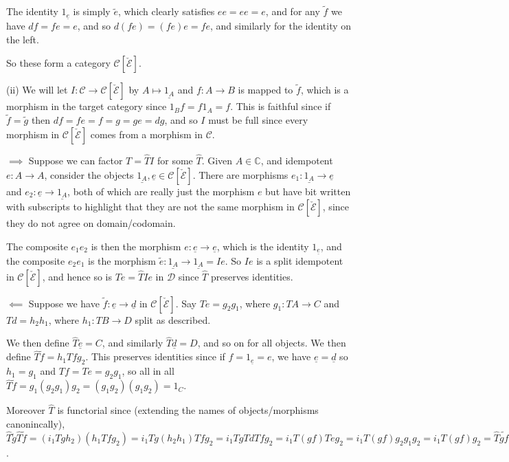 \documentclass[]{article}
\theoremstyle{custhm}
\theoremstyle{cusdef}
\theoremstyle{custhm}
\theoremstyle{custhm}
\theoremstyle{custhm}
\theoremstyle{custhm}
\theoremstyle{cusdef}
\theoremstyle{remark}
\newcommand{\C}{\mathbb{C}}
\newcommand{\ra}{\rightarrow}
\begin{document}
The identity $1_{\underline{e}}$ is simply $\tilde{e}$, which clearly satisfies $ee = ee = e$, and for any $\tilde{f}$ we have $df = fe = e$, and so $d(fe) = (fe)e = fe$, and similarly for the identity on the left.

So these form a category $\mathcal{C}[\check{\mathcal{E}}]$.

(ii) We will let $I: \mathcal{C} \ra \mathcal{C}[\check{\mathcal{E}}]$ by $A\mapsto \underline{1_A}$ and $f:A\ra B$ is mapped to $\tilde{f}$, which is a morphism in the target category since $1_Bf = f1_A = f$. This is faithful since if $\tilde{f} = \tilde{g}$ then $df = fe = f = g = ge = dg$, and so $I$ must be full since every morphism in $\mathcal{C}[\check{\mathcal{E}}]$ comes from a morphism in $\mathcal{C}$.


$\implies$ Suppose we can factor $T = \widehat{T}I$ for some $\widehat{T}$. Given $A\in \C$, and idempotent $e:A\ra A$, consider the objects $\underline{1_A},\underline{e} \in \mathcal{C}[\check{\mathcal{E}}]$. There are morphisms $e_1 : \underline{1_A}\ra \underline{e}$ and $e_2 : \underline{e}\ra \underline{1_A}$, both of which are really just the morphism $e$ but have bit written with subscripts to highlight that they are not the same morphism in $\mathcal{C}[\check{\mathcal{E}}]$, since they do not agree on domain/codomain.

The composite $e_1e_2$ is then the morphism $e:\underline{e}\ra\underline{e}$, which is the identity $1_{\underline{e}}$, and the composite $e_2e_1$ is the morphism $\tilde{e}:\underline{1_A}\ra\underline{1_A} = Ie$. So $Ie$ is a split idempotent in $\mathcal{C}[\check{\mathcal{E}}]$, and hence so is $Te = \widehat{T}Ie$ in $\mathcal{D}$ since $\widehat{T}$ preserves identities.

$\impliedby$ Suppose we have $\tilde{f}:\underline{e}\ra\underline{d}$ in $\mathcal{C}[\check{\mathcal{E}}]$. Say $Te = g_2g_1$, where $g_1:TA\ra C$ and $Td = h_2h_1$, where $h_1:TB \ra D$ split as described.

We then define $\widehat{T}\underline{e} = C$, and similarly $\widehat{T}\underline{d} = D$, and so on for all objects. We then define $\widehat{T}\tilde{f} = h_1Tfg_2$. This preserves identities since if $f = 1_{\underline{e}} = e$, we have $\underline{e} = \underline{d}$ so $h_1 = g_1$ and $Tf = Te = g_2g_1$, so all in all $\widehat{T}\tilde{f} = g_1(g_2g_1)g_2 = (g_1g_2)(g_1g_2) = 1_{C}$.

Moreover $\widehat{T}$ is functorial since (extending the names of objects/morphisms canonincally), $\widehat{T}\tilde{g}\widehat{T}\tilde{f} = (i_1Tgh_2)(h_1Tfg_2) = i_1Tg(h_2h_1)Tfg_2 = i_1 TgTdTfg_2 = i_1T(gf)Teg_2 = i_1T(gf)g_2g_1g_2 = i_1T(gf)g_2 = \widehat{T}\tilde{gf}$.
\end{document}
